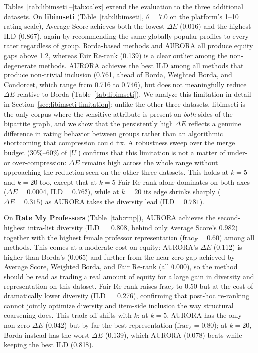 \documentclass[a4paper,fleqn]{cas-dc}
\begin{document}
Tables~\ref{tab:libimseti}--\ref{tab:oalex} extend the evaluation to the
three additional datasets. On \textbf{libimseti} (Table~\ref{tab:libimseti},
$\theta=7.0$ on the platform's 1--10 rating scale), Average Score achieves
both the lowest $\Delta E$ (0.016) and the highest ILD (0.867), again by
recommending the same globally popular profiles to every rater regardless of
group. Borda-based methods and AURORA all produce equity gaps above 1.2,
whereas Fair Re-rank (0.139) is a clear outlier among the non-degenerate
methods. AURORA achieves the best ILD among all methods that produce
non-trivial inclusion (0.761, ahead of Borda, Weighted Borda, and Condorcet,
which range from 0.716 to 0.746), but does not meaningfully reduce $\Delta E$
relative to Borda (Table~\ref{tab:libimseti}).
We analyze this limitation in detail in
Section~\ref{sec:libimseti-limitation}: unlike the other three
datasets, libimseti is the only corpus where the sensitive attribute is
present on \emph{both} sides of the bipartite graph, and we show that the
persistently high $\Delta E$ reflects a genuine difference in rating
behavior between groups rather than an algorithmic shortcoming that
compression could fix. A robustness sweep over the merge budget (30\%--60\%
of $|U|$) confirms that this limitation is not a matter of under- or
over-compression: $\Delta E$ remains high across the whole range without
approaching the reduction seen on the other three datasets. This holds at
$k=5$ and $k=20$ too, except that at $k=5$ Fair Re-rank alone dominates
on both axes ($\Delta E=0.0004$, ILD$=0.762$), while at $k=20$ its edge
shrinks sharply ($\Delta E=0.315$) as AURORA takes the diversity lead
(ILD$=0.781$).

On \textbf{Rate My Professors} (Table~\ref{tab:rmp}), AURORA achieves the
second-highest intra-list diversity (ILD\,$=$\,0.808, behind only Average
Score's 0.982) together with the highest female professor representation
($\mathrm{frac}_F = 0.60$) among all methods. This comes at a moderate cost
on equity: AURORA's $\Delta E$ (0.112) is higher than Borda's (0.065) and
further from the near-zero gap achieved by Average Score, Weighted Borda,
and Fair Re-rank (all 0.000), so the method should be read as trading a
real amount of equity for a large gain in diversity and representation on
this dataset. Fair Re-rank raises $\mathrm{frac}_F$ to 0.50 but at the
cost of dramatically lower diversity (ILD\,$=$\,0.276), confirming that
post-hoc re-ranking cannot jointly optimize diversity and item-side
inclusion the way structural coarsening does. This trade-off shifts with
$k$: at $k=5$, AURORA has the only non-zero $\Delta E$ (0.042) but by
far the best representation ($\mathrm{frac}_F=0.80$); at $k=20$, Borda
instead has the worst $\Delta E$ (0.139), which AURORA (0.078) beats
while keeping the best ILD (0.818).
\end{document}
